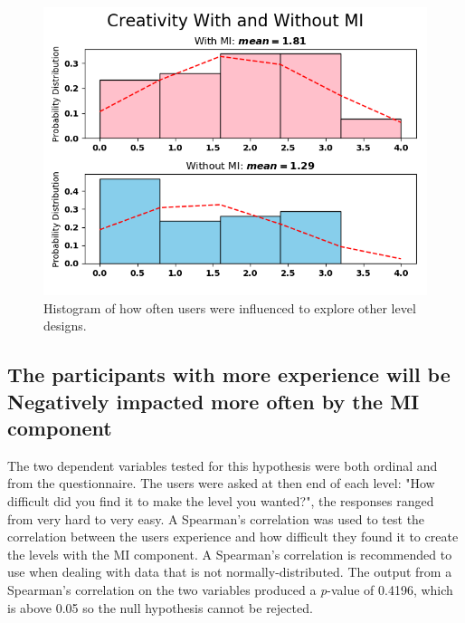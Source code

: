 \documentclass[journal]{IEEEtran}
\begin{document}
\begin{figure}[h]
	\includegraphics[width=1\linewidth]{CreativityWithandWithoutMI.png}
	\caption{Histogram of how often users were influenced to explore other level designs.}
	\label{alterHisto}
\end{figure}
\begin{table}[h]
	\centering
	\caption{Questionnaire Response Numerical Values}
	\label{responsValues}
	\def\arraystretch{2}
\end{table}

\subsection{The participants with more experience will be Negatively impacted more often by the MI component}
The two dependent variables tested for this hypothesis were both ordinal and from the questionnaire. The users were asked at then end of each level: "How difficult did you find it to make the level you wanted?", the responses ranged from very hard to very easy. A Spearman's correlation was used to test the correlation between the users experience and how difficult they found it to create the levels with the MI component. A Spearman's correlation is recommended to use when dealing with data that is not normally-distributed\cite{o2005step}. The output from a Spearman's correlation on the two variables produced a \textit{p}-value of  0.4196, which is above 0.05 so the null hypothesis cannot be rejected. 
\end{document}
